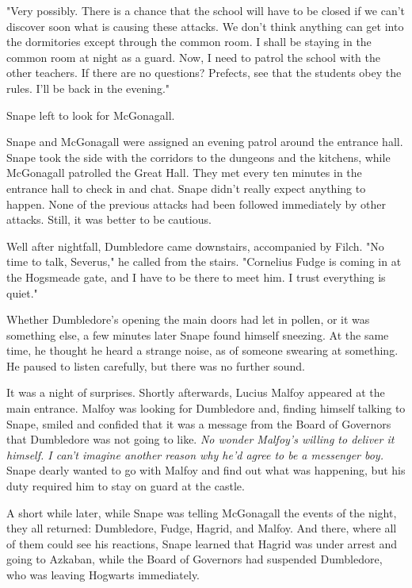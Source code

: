 "Very possibly. There is a chance that the school will have to be closed if we can't discover soon what is causing these attacks. We don't think anything can get into the dormitories except through the common room. I shall be staying in the common room at night as a guard. Now, I need to patrol the school with the other teachers. If there are no questions? Prefects, see that the students obey the rules. I'll be back in the evening."

Snape left to look for McGonagall.

Snape and McGonagall were assigned an evening patrol around the entrance hall. Snape took the side with the corridors to the dungeons and the kitchens, while McGonagall patrolled the Great Hall. They met every ten minutes in the entrance hall to check in and chat. Snape didn't really expect anything to happen. None of the previous attacks had been followed immediately by other attacks. Still, it was better to be cautious.

Well after nightfall, Dumbledore came downstairs, accompanied by Filch. "No time to talk, Severus," he called from the stairs. "Cornelius Fudge is coming in at the Hogsmeade gate, and I have to be there to meet him. I trust everything is quiet."

Whether Dumbledore's opening the main doors had let in pollen, or it was something else, a few minutes later Snape found himself sneezing. At the same time, he thought he heard a strange noise, as of someone swearing at something. He paused to listen carefully, but there was no further sound.

It was a night of surprises. Shortly afterwards, Lucius Malfoy appeared at the main entrance. Malfoy was looking for Dumbledore and, finding himself talking to Snape, smiled and confided that it was a message from the Board of Governors that Dumbledore was not going to like. \emph{No wonder Malfoy's willing to deliver it himself. I can't imagine another reason why he'd agree to be a messenger boy.} Snape dearly wanted to go with Malfoy and find out what was happening, but his duty required him to stay on guard at the castle.

A short while later, while Snape was telling McGonagall the events of the night, they all returned: Dumbledore, Fudge, Hagrid, and Malfoy. And there, where all of them could see his reactions, Snape learned that Hagrid was under arrest and going to Azkaban, while the Board of Governors had suspended Dumbledore, who was leaving Hogwarts immediately.

